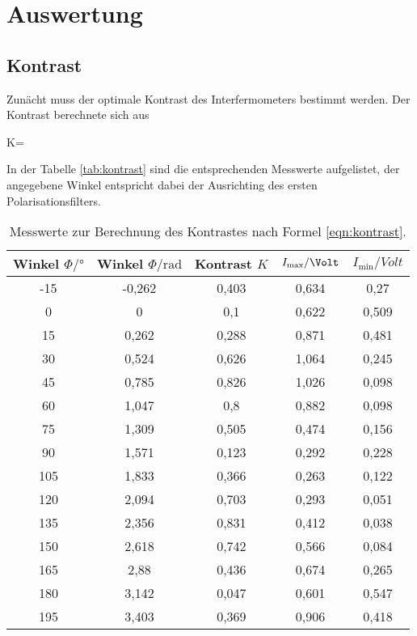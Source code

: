 \section{Auswertung}
\label{sec:Auswertung}
\subsection{Kontrast}
\label{sec:Kontrast}
Zunächt muss der optimale Kontrast des Interfermometers bestimmt
werden.
Der Kontrast berechnete sich aus
\begin{algin}
K=\label{eqn:kontrast}
\end{algin}
In der Tabelle \ref{tab:kontrast}
sind die entsprechenden Messwerte aufgelistet, der angegebene Winkel
entspricht dabei der Ausrichting des ersten Polarisationsfilters.
\begin{table}
\centering
\caption{Messwerte zur Berechnung des Kontrastes nach Formel \eqref{eqn:kontrast}.}
\begin{tabular}{c c c c c}
\toprule
   Winkel $\Phi/\si{\degree}$&   Winkel $\Phi/\si{\radian}$ &  Kontrast $K$ &   $I_\mathrm{max}/\si{\Volt}$ &    $I_\mathrm{min}/\si{Volt}$ \\
\midrule
    -15 &   -0,262 &      0,403 &   0,634 &    0,27  \\
      0 &    0     &      0,1   &   0,622 &    0,509 \\
     15 &    0,262 &      0,288 &   0,871 &    0,481 \\
     30 &    0,524 &      0,626 &   1,064 &    0,245 \\
     45 &    0,785 &      0,826 &   1,026 &    0,098 \\
     60 &    1,047 &      0,8   &   0,882 &    0,098 \\
     75 &    1,309 &      0,505 &   0,474 &    0,156 \\
     90 &    1,571 &      0,123 &   0,292 &    0,228 \\
    105 &    1,833 &      0,366 &   0,263 &    0,122 \\
    120 &    2,094 &      0,703 &   0,293 &    0,051 \\
    135 &    2,356 &      0,831 &   0,412 &    0,038 \\
    150 &    2,618 &      0,742 &   0,566 &    0,084 \\
    165 &    2,88  &      0,436 &   0,674 &    0,265 \\
    180 &    3,142 &      0,047 &   0,601 &    0,547 \\
    195 &    3,403 &      0,369 &   0,906 &    0,418 \\
\bottomrule
\end{tabular}
\end{table}

